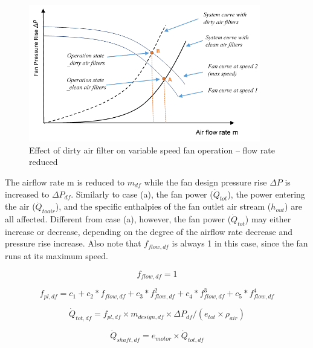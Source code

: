 \begin{figure}[hbtp] %
\centering
\includegraphics[width=0.9\textwidth, height=0.9\textheight, keepaspectratio=true]{media/image8007.png}
\caption{Effect of dirty air filter on variable speed fan operation – flow rate reduced \protect \label{fig:effect-of-dirty-air-filter-on-variable-speed-001}}
\end{figure}

The airflow rate m is reduced to \(m_{df}\) while the fan design pressure rise \(\Delta P\) is increased to \(\Delta P_{df}\). Similarly to case (a), the fan power (\(\dot Q_{tot}\)), the power entering the air (\(\dot Q_{toair}\)), and the specific enthalpies of the fan outlet air stream (\(h_{out}\)) are all affected. Different from case (a), however, the fan power (\(\dot Q_{tot}\)) may either increase or decrease, depending on the degree of the airflow rate decrease and pressure rise increase. Also note that \(f_{flow,df}\) is always 1 in this case, since the fan runs at its maximum speed.

\begin{equation}
f_{flow,df} = 1
\end{equation}

\begin{equation}
f_{pl,df} = c_{1} + c_{2}*f_{flow,df} + c_{3}*f_{flow,df}^2 + c_{4}*f_{flow,df}^3 + c_{5}*f_{flow,df}^4
\end{equation}

\begin{equation}
\dot{Q}_{tot,df} = f_{pl,df} \times m_{design,df} \times \Delta P_{df} / (e_{tot} \times \rho_{air} )
\end{equation}

\begin{equation}
\dot{Q}_{shaft,df} = e_{motor} \times \dot{Q}_{tot, df}
\end{equation}

